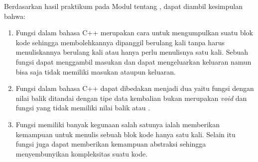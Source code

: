 \documentclass{subfiles}
\begin{document}
    Berdasarkan hasil praktikum pada Modul {} tentang {\leftmark}, dapat diambil kesimpulan bahwa:
    \begin{enumerate}
        \item {Fungsi dalam bahasa C++ merupakan cara untuk mengumpulkan suatu blok kode sehingga membolehkannya dipanggil berulang kali tanpa harus menuliskannya berulang kali atau hanya perlu menulisnya satu kali. Sebuah fungsi dapat menggambil masukan dan dapat mengeluarkan keluaran namun bisa saja tidak memiliki masukan ataupun keluaran.}
        \item {Fungsi dalam bahasa C++ dapat dibedakan menjadi dua yaitu fungsi dengan nilai balik ditandai dengan tipe data kembalian bukan merupakan \textit{void} dan fungsi yang tidak memiliki nilai balik atau {\procedure}.}
        \item {Fungsi memiliki banyak kegunaan salah satunya ialah memberikan kemampuan untuk menulis sebuah blok kode hanya satu kali. Selain itu fungsi juga dapat memberikan kemampuan abstraksi sehingga menyembunyikan kompleksitas suatu kode.}
    \end{enumerate}
\end{document}
